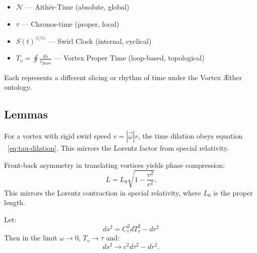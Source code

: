 \documentclass[preprint]{revtex4-2}
\begin{document}
    \begin{tcolorbox}[title=Key Temporal Variables in VAM]
        \begin{itemize}
            \item \( \mathcal{N} \) — Aithēr-Time (absolute, global)
            \item \( \tau \) — Chronos-time (proper, local)
            \item \( S(t)^{\circlearrowleft/\circlearrowright} \) — Swirl Clock (internal, cyclical)
            \item \( T_v = \oint \frac{ds}{v_{\text{phase}}} \) — Vortex Proper Time (loop-based, topological)
        \end{itemize}
        Each represents a different slicing or rhythm of time under the Vortex Æther ontology.
    \end{tcolorbox}


    \subsection{Lemmas}

    \begin{lemma*}
        For a vortex with rigid swirl speed \( v = |\vec{\omega}| r \), the time dilation obeys equation ~\eqref{eq:tau-dilation}. This mirrors the Lorentz factor from special relativity.
    \end{lemma*}

    \begin{lemma*}
        Front-back asymmetry in translating vortices yields phase compression:
        \begin{equation}
            \boxed{
                L = L_0 \sqrt{1 - \frac{v^2}{c^2}}.
            }
            \label{eq:lorentz-length-contraction}
        \end{equation}
        This mirrors the Lorentz contraction in special relativity, where \( L_0 \) is the proper length.
    \end{lemma*}

    \begin{lemma*}
        Let:
        \begin{equation}
            \boxed{
                ds^2 = C_e^2 dT_v^2 - dr^2
            }
            \label{eq:swirl-metric}
        \end{equation}
        Then in the limit \( \omega \to 0 \), \( T_v \to \tau \) and:
        \[
            ds^2 \to c^2 d\tau^2 - dr^2.
        \]
    \end{lemma*}
\end{document}
